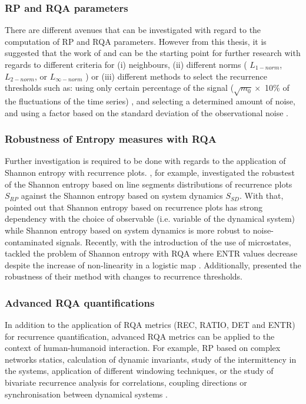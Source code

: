 \subsubsection*{RP and RQA parameters}
There are different avenues that can be investigated 
with regard to the computation of RP and RQA parameters.
However from this thesis, it is suggested that the work of 
\cite{marwan2007} and \cite{marwan2015} can be the starting point 
for further research with regards to different criteria for 
(i) neighbours, 
(ii) different norms ( $L_{1-norm}$, $L_{2-norm}$, or $L_{\infty-norm}$ ) or 
(iii) different methods to select the recurrence thresholds such as: 
using only certain percentage of the signal
($\sqrt{m_0} \times$ 10\% of the fluctuations of the time series)
\citep{letellier2006}, and selecting a determined amount of noise, and 
using a factor based on the standard deviation of the 
observational noise \citep{marwan2007}.

\subsubsection*{Robustness of Entropy measures with RQA}
Further investigation is required 
to be done with regards to the application of Shannon entropy with 
recurrence plots.
\cite{letellier2006}, for example, investigated the robustest of 
the Shannon entropy based on line segments distributions of 
recurrence plots $S_{RP}$ 
against the Shannon entropy based on system dynamics $S_{SD}$.
With that, \cite{letellier2006} pointed out that Shannon entropy based on 
recurrence plots has strong dependency with the choice of observable 
(i.e. variable of the dynamical system) while Shannon entropy based on 
system dynamics is more robust to noise-contaminated signals.
Recently, with the introduction of the use of microstates, 
\cite{corso2017} tackled the problem of Shannon entropy with RQA
where ENTR values decrease despite the increase of non-linearity 
in a logistic map \citep{marwan2007}. 
Additionally, \cite{corso2017} presented the robustness of their method 
with changes to recurrence thresholds.

\subsubsection*{Advanced RQA quantifications}
In addition to the application of RQA metrics (REC, RATIO, DET and ENTR) for 
recurrence quantification, advanced RQA metrics can be applied to 
the context of human-humanoid interaction. 
For example, RP based on complex networks statics, 
calculation of dynamic invariants, study of the intermittency in the systems, 
application of different windowing techniques, or 
the study of bivariate recurrence analysis for correlations, 
coupling directions or synchronisation between dynamical systems
\citep{marwan2007, marwan2015}.

